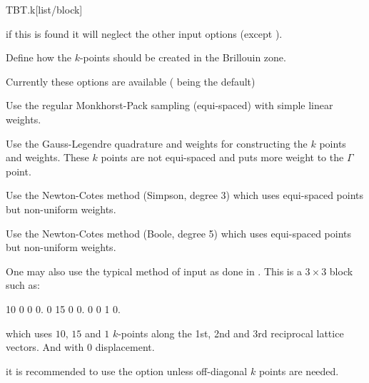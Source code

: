 \begin{fdfentry}{TBT.k}[list/block]
\begin{fdfoptions}
    \note if this is found it will neglect the other input options
    (except ).

    \option[method]%

    Define how the $k$-points should be created in the Brillouin zone.

    Currently these options are available ( being
    the default)
    \begin{fdfoptions}


      Use the regular Monkhorst-Pack sampling (equi-spaced) with
      simple linear weights.



      Use the Gauss-Legendre quadrature and weights for constructing
      the $k$ points and weights. These $k$ points are not
      equi-spaced and puts more weight to the $\Gamma$ point.


      
      Use the Newton-Cotes method (Simpson, degree 3) which uses equi-spaced
      points but non-uniform weights.



      Use the Newton-Cotes method (Boole, degree 5) which uses equi-spaced
      points but non-uniform weights.

    \end{fdfoptions}


    One may also use the typical  method
    of input as done in \siesta. This is a $3\times3$ block such as:
    \begin{fdfexample}
  10  0  0 0.
   0 15  0 0.
   0  0  1 0.
    \end{fdfexample}
    which uses $10$, $15$ and $1$ $k$-points along the 1st, 2nd and
    3rd reciprocal lattice vectors. And with $0$ displacement.

    \note it is recommended to use the  option unless
    off-diagonal $k$ points are needed.

  \end{fdfoptions}
  
\end{fdfentry}


